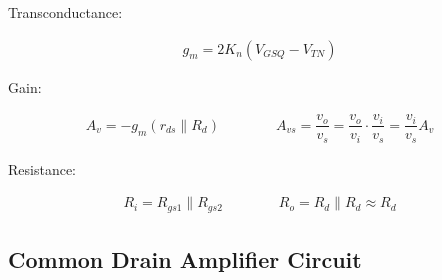 Transconductance:

\begin{equation*}
  \begin{aligned}
    g_m = 2 K_n \left( V_{GSQ} - V_{TN} \right)
  \end{aligned}
\end{equation*}

Gain:

\begin{equation*}
  \begin{aligned}
    A_v = - g_m \left( r_{ds} \parallel R_d \right) \quad\quad \quad\quad 
    A_{vs} = \dfrac{v_o}{v_s} = \dfrac{v_o}{v_i} \cdot \dfrac{v_i}{v_s} = \dfrac{v_i}{v_s} A_v
  \end{aligned}
\end{equation*}

Resistance:

\begin{equation*}
  \begin{aligned}
    R_i = R_{gs1} \parallel R_{gs2} \quad\quad \quad\quad 
    R_o = R_d \parallel R_d \approx R_d
  \end{aligned}
\end{equation*}

\subsection{Common Drain Amplifier Circuit}

